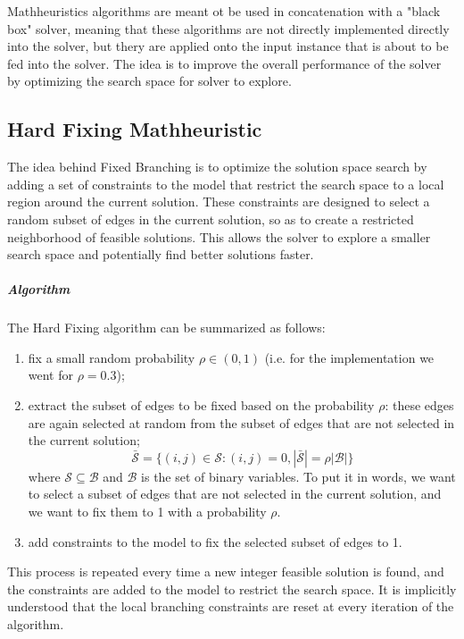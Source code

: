 \documentclass{article}
\begin{document}
Mathheuristics algorithms are meant ot be used in concatenation with a "black box" solver, meaning that these algorithms are not directly implemented directly into the solver, but thery are 
applied onto the input instance that is about to be fed into the solver. The idea is to improve the overall performance of the solver by optimizing the search space for solver to explore.\cite{Fischetti2016Matheuristics}

\subsection{Hard Fixing Mathheuristic}
The idea behind Fixed Branching is to optimize the solution space search by adding a set of constraints to the model that restrict the 
search space to a local region around the current solution. These constraints are designed to select a random subset of edges in the current solution, 
so as to create a restricted neighborhood of feasible solutions. 
This allows the solver to explore a smaller search space and potentially find better solutions faster. 

\subparagraph{Algorithm}
The Hard Fixing algorithm can be summarized as follows: 
\begin{enumerate}
	\item fix a small random probability $\rho \in (0, 1)$ (i.e. for the implementation we went for $\rho = 0.3$);
	\item extract the subset of edges to be fixed based on the probability $\rho$: these edges are again selected at random from the subset of edges that are not selected in the current solution;
	\begin{equation}
		\bar{\mathcal{S}} = \{ (i, j) \in \mathcal{S} : (i, j) = 0, |\bar{\mathcal{S}}| = \rho |\mathcal{B}|\}
	\end{equation}
	where $\mathcal{S} \subseteq \mathcal{B}$ and $\mathcal{B}$ is the set of binary variables. 
	To put it in words, we want to select a subset of edges that are not selected in the current solution, and we want to fix them to 1 with a probability $\rho$.
	\item add constraints to the model to fix the selected subset of edges to 1.
\end{enumerate}
This process is repeated every time a new integer feasible solution is found, and the constraints are added to the model to restrict the search space. It is implicitly 
understood that the local branching constraints are reset at every iteration of the algorithm. 
\end{document}
